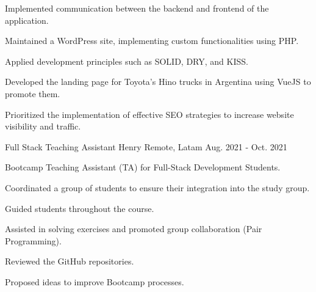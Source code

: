 \begin{cventries}
{\begin{cvitems}
        \item {Implemented communication between the backend and frontend of the application.}
        \item {Maintained a WordPress site, implementing custom functionalities using PHP.}
        \item {Applied development principles such as SOLID, DRY, and KISS.}
        \item {Developed the landing page for Toyota's Hino trucks in Argentina using VueJS to promote them.}
        \item {Prioritized the implementation of effective SEO strategies to increase website visibility and traffic.}
      \end{cvitems}
    }
  \vspace{5.5mm}
  \cventry
    {Full Stack Teaching Assistant} %
    {Henry} %
    {Remote, Latam} %
    {Aug. 2021 - Oct. 2021} %
    {
      \begin{cvitems} %
        \item {Bootcamp Teaching Assistant (TA) for Full-Stack Development Students.}
        \item {Coordinated a group of students to ensure their integration into the study group.}
        \item {Guided students throughout the course.}
        \item {Assisted in solving exercises and promoted group collaboration (Pair Programming).}
        \item {Reviewed the GitHub repositories.}
        \item {Proposed ideas to improve Bootcamp processes.}
      \end{cvitems}
    }

\end{cventries}
